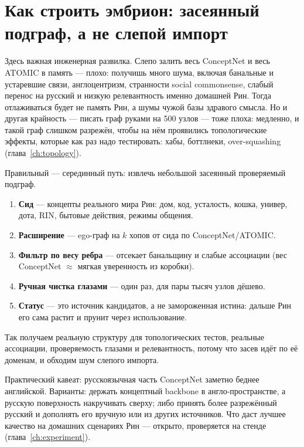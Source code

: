 \section{Как строить эмбрион: засеянный подграф, а не слепой импорт}
\label{sec:embryo-build}

Здесь важная инженерная развилка. Слепо залить весь ConceptNet и весь ATOMIC в память
— плохо: получишь много шума, включая банальные и устаревшие связи, англоцентризм,
странности social commonsense, слабый перенос на русский и низкую релевантность
именно домашней Рин. Тогда отлаживаться будет не память Рин, а шумы чужой базы
здравого смысла. Но и другая крайность — писать граф руками на 500 узлов — тоже
плоха: медленно, и такой граф слишком разрежён, чтобы на нём проявились
топологические эффекты, которые как раз надо тестировать: хабы, боттлнеки,
over-squashing (глава~\ref{ch:topology}).

Правильный — серединный путь: извлечь небольшой засеянный проверяемый подграф.
\begin{enumerate}\itemsep1pt
\item \textbf{Сид} — концепты реального мира Рин: дом, код, усталость, кошка, универ,
дота, RIN, бытовые действия, режимы общения.
\item \textbf{Расширение} — ego-граф на $k$ хопов от сида по ConceptNet/ATOMIC.
\item \textbf{Фильтр по весу ребра} — отсекает банальщину и слабые ассоциации
(вес ConceptNet $\approx$ мягкая уверенность из коробки).
\item \textbf{Ручная чистка глазами} — один раз, для пары тысяч узлов дёшево.
\item \textbf{Статус} — это источник кандидатов, а не замороженная истина: дальше
Рин его сама растит и прунит через использование.
\end{enumerate}
Так получаем реальную структуру для топологических тестов, реальные ассоциации,
проверяемость глазами и релевантность, потому что засев идёт по её доменам, и
обходим шум слепого импорта.

\begin{openq}
Практический кавеат: русскоязычная часть ConceptNet заметно беднее английской.
Варианты: держать концептный backbone в англо-пространстве, а русскую поверхность
накручивать сверху; либо принять более разрежённый русский и дополнять его
вручную или из других источников. Что даст лучшее качество на домашних сценариях
Рин — открыто, проверяется на стенде (глава~\ref{ch:experiment}).
\end{openq}

